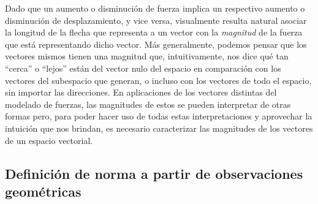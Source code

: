\documentclass[12pt,dvipsnames]{article}
\numberwithin{equation}{section}
\begin{document}
Dado que un aumento o disminución de fuerza implica un respectivo aumento o disminución de desplazamiento, y vice versa, visualmente resulta natural asociar la longitud de la flecha que representa a un vector con la \emph{magnitud} de la fuerza que está representando dicho vector. Más generalmente, podemos pensar que los vectores mismos tienen una magnitud que, intuitivamente, nos dice qué tan ``cerca'' o ``lejos'' están del vector nulo del espacio en comparación con los vectores del subespacio que generan, o incluso con los vectores de todo el espacio, sin importar las direcciones. En aplicaciones de los vectores distintas del modelado de fuerzas, las magnitudes de estos se pueden interpretar de otras formas pero, para poder hacer uso de todas estas interpretaciones y aprovechar la intuición que nos brindan, es necesario caracterizar las magnitudes de los vectores de un espacio vectorial.

\subsection{Definición de norma a partir de observaciones geométricas}

\end{document}
